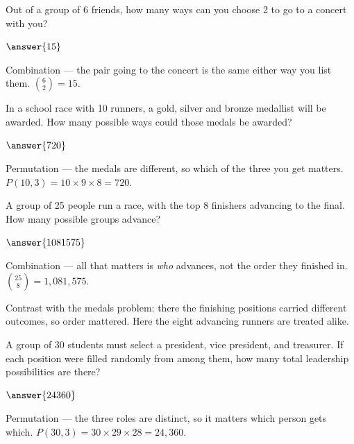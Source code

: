\documentclass[12pt]{ximera}
\begin{document}
\begin{problem}
Out of a group of 6 friends, how many ways can you choose 2 to go to a concert with you?
\begin{multipleChoice}
\end{multipleChoice}

$\answer{15}$

\begin{solution}
Combination --- the pair going to the concert is the same either way you list them.
$\binom{6}{2} = 15$.
\end{solution}
\end{problem}

\begin{problem}
In a school race with 10 runners, a gold, silver and bronze medallist will be awarded. How
many possible ways could those medals be awarded?
\begin{multipleChoice}
\end{multipleChoice}

$\answer{720}$

\begin{solution}
Permutation --- the medals are different, so which of the three you get matters.
$P(10,3) = 10 \times 9 \times 8 = 720$.
\end{solution}
\end{problem}

\begin{problem}
A group of 25 people run a race, with the top 8 finishers advancing to the final. How many
possible groups advance?
\begin{multipleChoice}
\end{multipleChoice}

$\answer{1081575}$

\begin{solution}
Combination --- all that matters is \emph{who} advances, not the order they finished in.
$\binom{25}{8} = 1{,}081{,}575$.

Contrast with the medals problem: there the finishing positions carried different
outcomes, so order mattered. Here the eight advancing runners are treated alike.
\end{solution}
\end{problem}

\begin{problem}
A group of 30 students must select a president, vice president, and treasurer. If each
position were filled randomly from among them, how many total leadership possibilities
are there?
\begin{multipleChoice}
\end{multipleChoice}

$\answer{24360}$

\begin{solution}
Permutation --- the three roles are distinct, so it matters which person gets which.
$P(30,3) = 30 \times 29 \times 28 = 24{,}360$.
\end{solution}
\end{problem}
\end{document}
